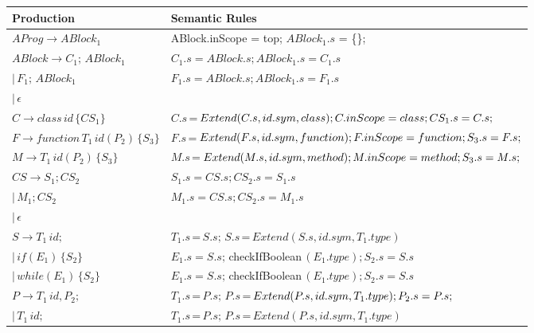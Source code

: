 \documentclass[11pt, oneside]{article}
\begin{document}
\begin{tabularx}{\textwidth}{ |X|X| }
\hline
\textbf{Production} & \textbf{Semantic Rules} \\
  
\hline $AProg \rightarrow ABlock_1$  &  ABlock.inScope = top; $ABlock_1.s$ = \{\}; \\

\hline $ABlock \rightarrow C_1; \, ABlock_1$  &  $C_1.s = ABlock.s; ABlock_1.s = C_1.s$ \\
	   $| \, F_1; \, ABlock_1$ & $F_1.s = ABlock.s; ABlock_1.s = F_1.s$ \\
	   $| \, \epsilon$ & \\
	   
\hline $C \rightarrow class \, id \, \{CS_1\} $ & $ C.s \, $=$ \, Extend(C.s, id.sym, class); \newline C.inScope = class; CS_1.s = C.s; $ \\

\hline $F \rightarrow function \, T_1 \, id(P_2) \, \{S_3\}$ & $F.s \, $=$ \, Extend(F.s, id.sym, function); \newline F.inScope = function; S_3.s = F.s; $ \\

\hline $M \rightarrow T_1 \, id(P_2) \, \{S_3\} $ & $ M.s \, $=$ \, Extend(M.s, id.sym, method); \newline M.inScope = method; S_3.s = M.s; $\\

\hline $CS \rightarrow S_1; CS_2 $ & $ S_1.s = CS.s; CS_2.s = S_1.s $\\
	   $| \, M_1; CS_2$ & $ M_1.s = CS.s; CS_2.s = M_1.s $ \\
	   $| \, \epsilon$ & \\

\hline $S \rightarrow T_1 \, id; $ & $T_1.s \, $=$ \, S.s; \, S.s \, $=$ \, Extend(S.s, id.sym, T_1.type)$ \\
	   $| \, if(E_1) \, \{S_2\} $ & $ E_1.s = S.s; \, $checkIfBoolean$ \, (E_1.type);  S_2.s = S.s $ \\
	   $| \, while(E_1) \, \{S_2\} $ & $ E_1.s = S.s; \, $checkIfBoolean$ \, (E_1.type);  S_2.s = S.s $ \\

\hline $P \rightarrow T_1 \, id, P_2; $ & $T_1.s \, $=$ \, P.s; \, P.s \, $=$ \, Extend(P.s, id.sym, T_1.type); \newline P_2.s = P.s; $ \\
          $| \,  T_1 \, id; $ & $T_1.s \, $=$ \, P.s; \, P.s \, $=$ \, Extend(P.s, id.sym, T_1.type) $ \\
	   

\end{tabularx}
\end{document}
